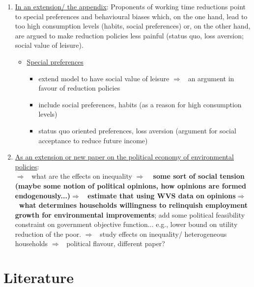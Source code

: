 \documentclass[12pt]{article}
\newcommand{\ar}{$\Rightarrow$ \ }
\begin{document}
\begin{enumerate}
\item  \underline{In an extension/ the appendix}:
Proponents of working time reductions point to special preferences and behavioural biases which, on the one hand, lead to too high consumption levels (habits, social preferences) or, on the other hand, are argued to make reduction policies less painful (status quo, loss aversion; social value of leisure). 
\begin{itemize}
	\item \underline{Special preferences}
	\begin{itemize}
		\item extend model to have social value of leisure \ar an argument in favour of reduction policies \citep{Alesina2005WorkDifferent}
		\item include social preferences, habits (as a reason for high consumption levels) \citep{Arrow2004AreMuch, Alvarez-Cuadrado2007EnvyHours, Ravn2006DeepHabits}
		\item status quo oriented preferences, loss aversion \citep{Schor2005SustainableReduction} (argument for social acceptance to reduce future income)
	\end{itemize}
\end{itemize}

\item \underline{As an extension or new paper on the political economy of environmental policies}: \\
\ar what are the effects on inequality \ar \textbf{ some sort of social tension (maybe some notion of political opinions, how opinions are formed endogenously...)\ar estimate that using WVS data on opinions\ar what determines households willingness to relinquish employment growth for environmental improvements}; 
 add some political feasibility constraint on government objective function... e.g., lower bound on utility reduction of the poor. \ar study effects on inequality/ heterogeneous households \ar political flavour, different paper?

\end{enumerate}
 

\section{Literature}
\end{document}
